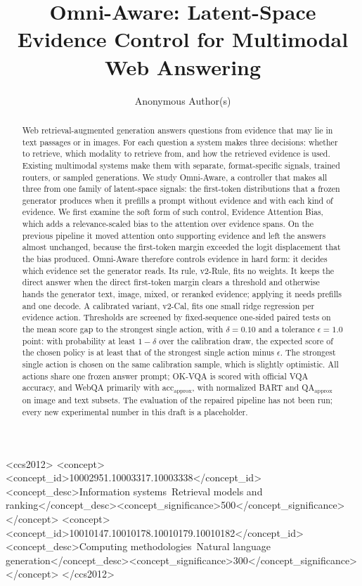 \documentclass[sigconf,anonymous,review]{acmart}
\newcommand{\method}{Omni-Aware}
\begin{document}
\title[Omni-Aware: Latent-Space Evidence Control]{Omni-Aware: Latent-Space Evidence Control for Multimodal Web Answering}

\author{Anonymous Author(s)}

\begin{abstract}
Web retrieval-augmented generation answers questions from evidence that may lie in text passages or in images.
For each question a system makes three decisions: whether to retrieve, which modality to retrieve from, and how the retrieved evidence is used.
Existing multimodal systems make them with separate, format-specific signals, trained routers, or sampled generations.
We study \method{}, a controller that makes all three from one family of latent-space signals: the first-token distributions that a frozen generator produces when it prefills a prompt without evidence and with each kind of evidence.
We first examine the soft form of such control, Evidence Attention Bias, which adds a relevance-scaled bias to the attention over evidence spans.
On the previous pipeline it moved attention onto supporting evidence and left the answers almost unchanged, because the first-token margin exceeded the logit displacement that the bias produced.
\method{} therefore controls evidence in hard form: it decides which evidence set the generator reads.
Its rule, v2-Rule, fits no weights. It keeps the direct answer when the direct first-token margin clears a threshold and otherwise hands the generator text, image, mixed, or reranked evidence; applying it needs prefills and one decode.
A calibrated variant, v2-Cal, fits one small ridge regression per evidence action.
Thresholds are screened by fixed-sequence one-sided paired tests on the mean score gap to the strongest single action, with $\delta=0.10$ and a tolerance $\epsilon=1.0$ point: with probability at least $1-\delta$ over the calibration draw, the expected score of the chosen policy is at least that of the strongest single action minus $\epsilon$.
The strongest single action is chosen on the same calibration sample, which is slightly optimistic.
All actions share one frozen answer prompt; OK-VQA is scored with official VQA accuracy, and WebQA primarily with acc$_{\mathrm{approx}}$, with normalized BART and QA$_{\mathrm{approx}}$ on image and text subsets.
The evaluation of the repaired pipeline has not been run; every new experimental number in this draft is a placeholder.
\end{abstract}

\begin{CCSXML}
<ccs2012>
<concept><concept_id>10002951.10003317.10003338</concept_id><concept_desc>Information systems~Retrieval models and ranking</concept_desc><concept_significance>500</concept_significance></concept>
<concept><concept_id>10010147.10010178.10010179.10010182</concept_id><concept_desc>Computing methodologies~Natural language generation</concept_desc><concept_significance>300</concept_significance></concept>
</ccs2012>
\end{CCSXML}
\end{document}
